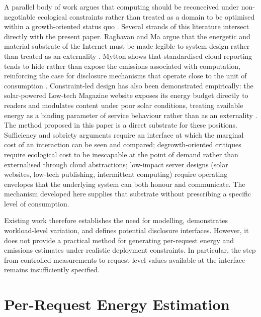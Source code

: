 \documentclass[sigconf]{acmart}
\begin{document}
A parallel body of work argues that computing should be reconceived
under non-negotiable ecological constraints rather than treated as a
domain to be optimised within a growth-oriented status quo
\cite{nardi2018computingwithinlimits,pargman2014rethinking,becker2023insolvent}.
Several strands of this literature intersect directly with the present
paper. Raghavan and Ma argue that the energetic and material substrate
of the Internet must be made legible to system design rather than treated
as an externality \cite{raghavan2011energy}. Mytton shows that
standardised cloud reporting tends to hide rather than expose the
emissions associated with computation, reinforcing the case for
disclosure mechanisms that operate close to the unit of consumption
\cite{mytton2020hiding}. Constraint-led design has also been demonstrated
empirically: the solar-powered Low-tech Magazine website exposes its
energy budget directly to readers and modulates content under poor
solar conditions, treating available energy as a binding parameter of
service behaviour rather than as an externality
\cite{dedecker2018solar}. The method proposed in this paper is a
direct substrate for these positions. Sufficiency and sobriety
arguments require an interface at which the marginal cost of an
interaction can be seen and compared; degrowth-oriented critiques
require ecological cost to be inescapable at the point of demand
rather than externalised through cloud abstractions; low-impact
server designs (solar websites, low-tech publishing, intermittent
computing) require operating envelopes that the underlying system can
both honour and communicate. The mechanism developed here supplies
that substrate without prescribing a specific level of consumption.

Existing work therefore establishes the need for modelling, demonstrates
workload-level variation, and defines potential disclosure interfaces.
However, it does not provide a practical method for generating per-request
energy and emissions estimates under realistic deployment constraints. In
particular, the step from controlled measurements to request-level values
available at the interface remains insufficiently specified.


\section{Per-Request Energy Estimation}
\label{sec:methods}
\end{document}
